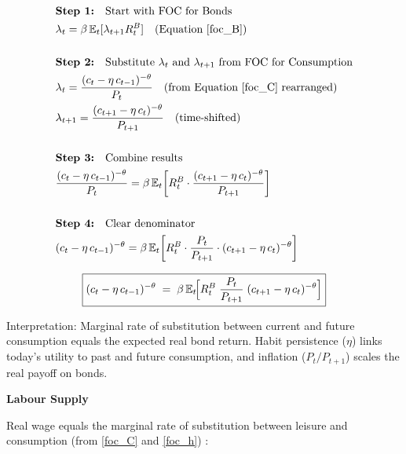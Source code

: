 \documentclass[11pt,preprint]{elsarticle}
\numberwithin{equation}{section}
\numberwithin{figure}{section}
\numberwithin{table}{section}
\begin{document}
\begin{align*}
& \textbf{Step 1:} \quad \text{Start with FOC for Bonds} \\
& \lambda_t = \beta\,\mathbb{E}_t[\lambda_{t+1}R_t^B] \quad \text{(Equation \ref{foc_B})} \\
& \\
& \textbf{Step 2:} \quad \text{Substitute } \lambda_t \text{ and } \lambda_{t+1} \text{ from FOC for Consumption} \\
& \lambda_t = \frac{(c_t - \eta\,c_{t-1})^{-\theta}}{P_t} \quad \text{(from Equation \ref{foc_C} rearranged)} \\
& \lambda_{t+1} = \frac{(c_{t+1} - \eta\,c_t)^{-\theta}}{P_{t+1}} \quad \text{(time-shifted)} \\
& \\
& \textbf{Step 3:} \quad \text{Combine results} \\
& \frac{(c_t - \eta\,c_{t-1})^{-\theta}}{P_t} = \beta\,\mathbb{E}_t\!\left[ R_t^B \cdot \frac{(c_{t+1} - \eta\,c_t)^{-\theta}}{P_{t+1}} \right] \\
& \\
& \textbf{Step 4:} \quad \text{Clear denominator} \\
& (c_t - \eta\,c_{t-1})^{-\theta} = \beta\,\mathbb{E}_t\!\left[ R_t^B \cdot \frac{P_t}{P_{t+1}} \cdot (c_{t+1} - \eta\,c_t)^{-\theta} \right]
\end{align*}

\begin{equation}\label{consEuler_app}
\boxed{%
  (c_t - \eta\,c_{t-1})^{-\theta}
  \;=\;
  \beta\,\mathbb{E}_t\!\Bigl[
    R_t^B \;\frac{P_t}{P_{t+1}}\;(c_{t+1} - \eta\,c_t)^{-\theta}
  \Bigr]
}
\end{equation}

Interpretation: Marginal rate of substitution between current and future
consumption equals the expected real bond return. Habit persistence
(\(\eta\)) links today's utility to past and future consumption, and
inflation (\(P_t/P_{t+1}\)) scales the real payoff on bonds.

\textbf{Labour Supply}

Real wage equals the marginal rate of substitution between leisure and
consumption (from \eqref{foc_C} and \eqref{foc_h}) :
\end{document}
